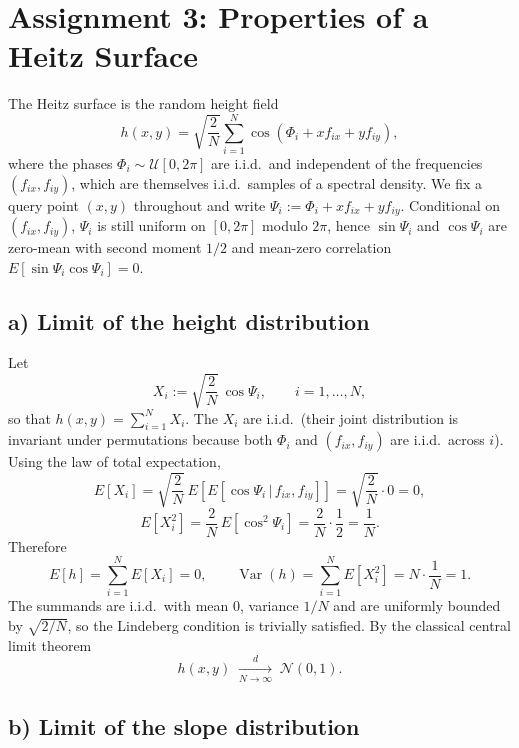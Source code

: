 \documentclass[a4paper,11pt]{article}
\begin{document}
\section*{Assignment 3: Properties of a Heitz Surface}

The Heitz surface is the random height field
\[
h(x,y) = \sqrt{\frac{2}{N}}\sum_{i=1}^{N}\cos(\Phi_i + x f_{ix} + y f_{iy}),
\]
where the phases $\Phi_i \sim \mathcal{U}[0,2\pi]$ are i.i.d.\ and independent
of the frequencies $(f_{ix},f_{iy})$, which are themselves i.i.d.\ samples of a
spectral density. We fix a query point $(x,y)$ throughout and write
\(\Psi_i := \Phi_i + x f_{ix} + y f_{iy}\). Conditional on
$(f_{ix},f_{iy})$, $\Psi_i$ is still uniform on $[0,2\pi]$ modulo $2\pi$, hence
$\sin\Psi_i$ and $\cos\Psi_i$ are zero-mean with second moment $1/2$ and
mean-zero correlation $E[\sin\Psi_i\cos\Psi_i]=0$.

\subsection*{a) Limit of the height distribution}

Let
\[
X_i := \sqrt{\frac{2}{N}}\,\cos\Psi_i,
\qquad i=1,\dots,N,
\]
so that $h(x,y)=\sum_{i=1}^N X_i$. The $X_i$ are i.i.d.\ (their joint
distribution is invariant under permutations because both $\Phi_i$ and
$(f_{ix},f_{iy})$ are i.i.d.\ across $i$). Using the law of total expectation,
\[
E[X_i] = \sqrt{\frac{2}{N}}\,E\!\left[E[\cos\Psi_i\,|\,f_{ix},f_{iy}]\right]
       = \sqrt{\frac{2}{N}}\cdot 0 = 0,
\]
\[
E[X_i^2] = \frac{2}{N}\,E[\cos^2\Psi_i]
        = \frac{2}{N}\cdot\frac{1}{2} = \frac{1}{N}.
\]
Therefore
\[
E[h] = \sum_{i=1}^N E[X_i] = 0,
\qquad
\operatorname{Var}(h) = \sum_{i=1}^N E[X_i^2] = N\cdot\frac{1}{N} = 1.
\]
The summands are i.i.d.\ with mean $0$, variance $1/N$ and are uniformly
bounded by $\sqrt{2/N}$, so the Lindeberg condition is trivially satisfied. By
the classical central limit theorem
\[
h(x,y) \;\xrightarrow[N\to\infty]{d}\; \mathcal{N}(0,1).
\]

\subsection*{b) Limit of the slope distribution}
\end{document}
